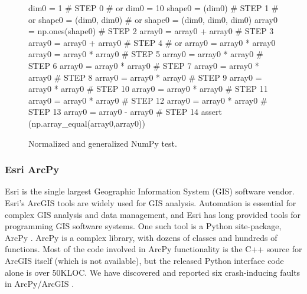 \begin{figure}
{\scriptsize
\begin{code}
dim0 = 1                            \textcolor{black!60}{\# STEP 0}
\textcolor{black!60}{\#  or dim0 = 10 }
shape0 = (dim0)                     \textcolor{black!60}{\# STEP 1}
\textcolor{black!60}{\#  or shape0 = (dim0, dim0) }
\textcolor{black!60}{\#  or shape0 = (dim0, dim0, dim0) }
array0 = np.ones(shape0)            \textcolor{black!60}{\# STEP 2}
array0 = array0 + array0            \textcolor{black!60}{\# STEP 3}
array0 = array0 + array0            \textcolor{black!60}{\# STEP 4}
\textcolor{black!60}{\#  or array0 = array0 * array0 }
array0 = array0 * array0            \textcolor{black!60}{\# STEP 5}
array0 = array0 * array0            \textcolor{black!60}{\# STEP 6}
array0 = array0 * array0            \textcolor{black!60}{\# STEP 7}
array0 = array0 * array0            \textcolor{black!60}{\# STEP 8}
array0 = array0 * array0            \textcolor{black!60}{\# STEP 9}
array0 = array0 * array0            \textcolor{black!60}{\# STEP 10}
array0 = array0 * array0            \textcolor{black!60}{\# STEP 11}
array0 = array0 * array0            \textcolor{black!60}{\# STEP 12}
array0 = array0 * array0            \textcolor{black!60}{\# STEP 13}
array0 = array0 - array0            \textcolor{black!60}{\# STEP 14}
assert (np.array\_equal(array0,array0))
\end{code}
}
\caption{Normalized and generalized NumPy test.}
\label{numpynormgen}
\end{figure}

\subsubsection{Esri ArcPy}

Esri is the single
largest Geographic Information System (GIS) software vendor.  Esri's ArcGIS tools are widely
used for GIS analysis.  Automation is essential for complex GIS analysis and
data management, and Esri has long provided tools
for programming GIS software systems.  One such tool
is a Python site-package, ArcPy \cite{ArcPy}.  ArcPy is a complex library,
with dozens of classes and hundreds of functions.  Most of the code involved in ArcPy
functionality is the C++ source for ArcGIS itself (which is not
available), but the released Python interface code alone is over 50KLOC.
We have  discovered and reported six crash-inducing faults in
ArcPy/ArcGIS \cite{tstlsttt}.  

